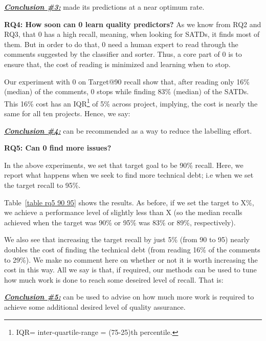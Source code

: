 \documentclass[10pt,conference]{IEEEtran}
\newenvironment{result}[2]
{\begin{myshadowbox}\textbf{\textit{\underline{Conclusion \##1:}}} #2}{ 
\end{myshadowbox}}
\begin{document}
\begin{result}{3}
{\IT}0 made its predictions
at a near optimum rate.
\end{result}


{\bf RQ4: How soon can {\IT}0 learn quality predictors?}
As we know from RQ2 and RQ3, that {\IT}0 has a high recall, meaning, when looking for SATDs, it finds most of them. But in order to do that, {\IT}0 need a human expert to read through the comments suggested by the classifier and sorter. Thus, a core part of {\IT}0 is to ensure that, the cost of reading is minimized and learning when to stop. 

Our experiment with {\IT}0 on Target@90 recall show that, after reading only 16\% (median) of the comments, {\IT}0 stops while finding 83\% (median) of the SATDs. This 16\% cost has an IQR\footnote{IQR= inter-quartile-range = (75-25)th percentile.} of 5\% across project, implying, the cost is nearly   the same for all ten projects. 
Hence, we say:
\begin{result}{4}
{\IT}0 can be recommended as a way to reduce the labelling effort.
\end{result}



{\bf RQ5: Can {\IT}0 find more     issues?}

In the above experiments, we set that target goal to be 90\% recall.
Here, we report what happens when we seek to find more technical debt;
i.e when we set the target recall to 95\%.

Table~\ref{table rq5 90 95} shows the results.
As before, if we set the target to X\%, we achieve
a performance level of slightly less than X
(so the median recalls achieved when the target was 90\% or 95\%
was 83\% or 89\%, respectively).

We also see that increasing the target recall by just 5\% (from 90 to 95) nearly doubles the cost of finding the technical debt
(from reading 16\% of the comments to 29\%). 
We make no comment here on whether or not it is worth
increasing the cost in this way. All we say is that, if
required, our methods can be used to tune how much work
is done to reach some deseired level of recall. That is:


\begin{result}{5}
 {\IT}0 can be used to   advise
on   how much more work is required to achieve 
some additional desired level of quality assurance.
\end{result}
\end{document}
